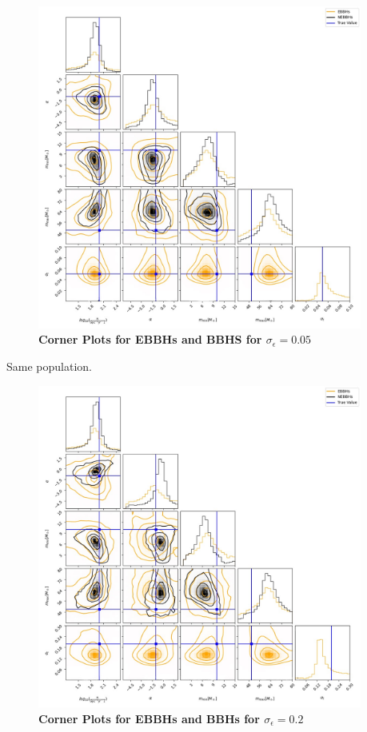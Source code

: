 \documentclass[twocolumn,prd,nofootinbib]{revtex4}
\begin{document}
\begin{figure}

\includegraphics[width=0.95\textwidth]{paper/figures/cor_0.05.png}
\caption{\label{fig:pop3d05}\textbf{Corner Plots for EBBHs and BBHS for $\sigma_\epsilon=0.05$}}

\end{figure}
Same population.
\begin{figure}

\includegraphics[width=0.95\textwidth]{paper/figures/cor_0.2.png}
\caption{\label{fig:pop3d05}\textbf{Corner Plots for EBBHs and BBHs for $\sigma_\epsilon=0.2$}}

\end{figure}
\end{document}
